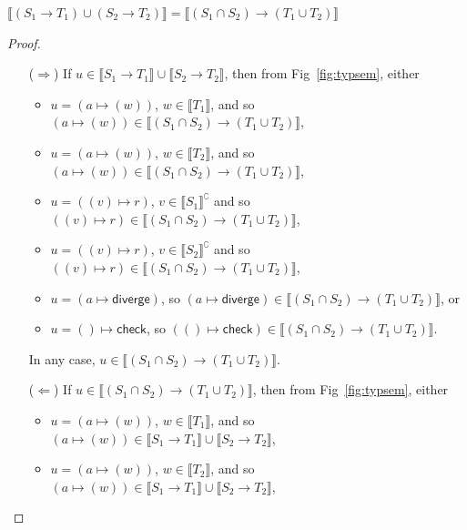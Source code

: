 \documentclass[acmsmall,review,screen]{acmart}
\newcommand{\DIVERGE}{\mathsf{diverge}}
\newcommand{\CHECK}{\mathsf{check}}
\newcommand{\fun}{\mathbin{\rightarrow}}
\newcommand{\sem}[1]{\llbracket{#1}\rrbracket}
\newcommand{\nsem}[1]{\llbracket{#1}\rrbracket^\complement}
\begin{document}
\begin{lemma} \label{lem:union-though-fun}
  $\sem{(S_1 \fun T_1) \cup (S_2 \fun T_2)} =
   \sem{(S_1 \cap S_2) \fun (T_1 \cup T_2)}$
\end{lemma}
\begin{proof} \mbox{}
  \begin{enumerate}
    
  \item[($\Rightarrow$)]
  If $u \in \sem{S_1 \fun T_1} \cup \sem{S_2 \fun T_2}$,
  then from Fig~\ref{fig:typsem}, either
  \begin{itemize}
    
  \item $u = (a \mapsto (w))$, $w \in \sem{T_1}$, 
    and so $(a \mapsto (w)) \in \sem{(S_1 \cap S_2) \fun (T_1 \cup T_2)}$,

  \item $u = (a \mapsto (w))$, $w \in \sem{T_2}$, 
    and so $(a \mapsto (w)) \in \sem{(S_1 \cap S_2) \fun (T_1 \cup T_2)}$,

  \item $u = ((v) \mapsto r)$, $v \in \nsem{S_1}$
    and so $((v) \mapsto r) \in \sem{(S_1 \cap S_2) \fun (T_1 \cup T_2)}$,

  \item $u = ((v) \mapsto r)$, $v \in \nsem{S_2}$
    and so $((v) \mapsto r) \in \sem{(S_1 \cap S_2) \fun (T_1 \cup T_2)}$,

  \item $u = (a \mapsto \DIVERGE)$, so $(a \mapsto \DIVERGE) \in \sem{(S_1 \cap S_2) \fun (T_1 \cup T_2)}$, or
    
  \item $u = () \mapsto \CHECK$, so $(() \mapsto \CHECK) \in \sem{(S_1 \cap S_2) \fun (T_1 \cup T_2)}$.

  \end{itemize}
  In any case, $u \in \sem{(S_1 \cap S_2) \fun (T_1 \cup T_2)}$.

  \item[($\Leftarrow$)]
  If $u \in \sem{(S_1 \cap S_2) \fun (T_1 \cup T_2)}$,
  then from Fig~\ref{fig:typsem}, either
  \begin{itemize}
    
  \item $u = (a \mapsto (w))$, $w \in \sem{T_1}$, 
    and so $(a \mapsto (w)) \in \sem{S_1 \fun T_1} \cup \sem{S_2 \fun T_2}$,

  \item $u = (a \mapsto (w))$, $w \in \sem{T_2}$, 
    and so $(a \mapsto (w)) \in \sem{S_1 \fun T_1} \cup \sem{S_2 \fun T_2}$,


\end{itemize}
\end{enumerate}
\end{proof}
\end{document}

